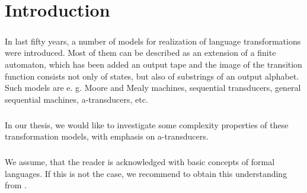 \chapter*{Introduction}
\paragraph{}
In last fifty years, a number of models for realization of language transformations were introduced. Most of them can be described as an extension of a finite automaton, which has been added an output tape and the image of the transition function consists not only of states, but also of substrings of an output alphabet. Such models are e. g. Moore and Mealy machines, sequential transducers, general sequential machines, a-transducers, etc.

\paragraph{}
In our thesis, we would like to investigate some complexity properties of these transformation models, with emphasis on a-transducers. 

\paragraph{}
We assume, that the reader is acknowledged with basic concepts of formal languages. If this is not the case, we recommend to obtain this understanding from \cite{hopcroft:fola}.
